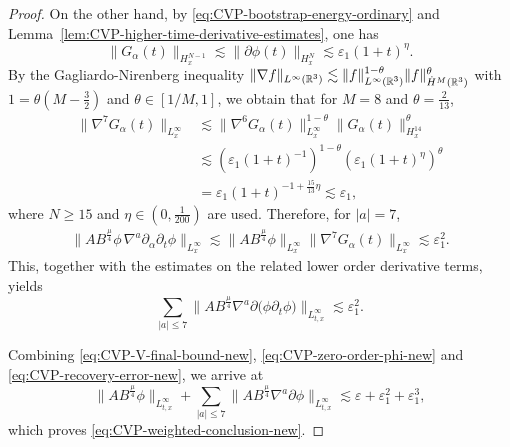 \documentclass[11pt,twoside]{article}
\def\R{\mathop{\mathbb R\kern 0pt}\nolimits}
\def\f{\frac}
\def\p{\partial}
\def\ve{\varepsilon}
\def\ls{\lesssim}
\theoremstyle{plain}
\theoremstyle{definition}
\theoremstyle{assumption}
\numberwithin{equation}{section}
\begin{document}
\begin{proof}
		On the other hand, by \eqref{eq:CVP-bootstrap-energy-ordinary} and 	Lemma~\ref{lem:CVP-higher-time-derivative-estimates},
one has
		\begin{equation}
			\label{eq:CVP-interpolation-high}
			\|G_\alpha(t)\|_{H^{N-1}_x}
			\ls
			\|\p\phi(t)\|_{H^N_x}
			\ls
			\ve_1(1+t)^\eta.
		\end{equation}
		By the Gagliardo-Nirenberg inequality $\|\nabla f \|_{L^\infty(\R^3)} \ls \|f\|_{L^\infty(\R^3)}^{1-\theta}\|f\|_{\dot{H}^M(\R^3)}^\theta $
with  $1=\theta(M-\f32)$ and $\theta \in [1/M,1]$,
		we obtain that for $M=8$ and $\theta=\f{2}{13}$,
		\begin{equation}
			\label{eq:CVP-top-interpolation}
			\begin{aligned}
				\|\nabla^7G_\alpha(t)\|_{L^\infty_x}
				&\ls
				\|\nabla^{6}G_\alpha(t)\|_{L^\infty_x}^{1-\theta}
				\|G_\alpha(t)\|_{H^{14}_x}^{\theta}
				\\
				&\ls
				\left(
				\ve_1(1+t)^{-1}
				\right)^{1-\theta}
				\left(
				\ve_1(1+t)^\eta
				\right)^\theta
				\\
				&=
				\ve_1
				(1+t)^{-1+\f{15}{13}\eta}
				\ls
				\ve_1,
			\end{aligned}
		\end{equation}
		where $N\ge 15$ and $\eta\in(0,\f{1}{200})$ are used.
		Therefore, for \(|a|=7\),
		\begin{equation}
			\label{eq:CVP-top-recovery-product}
			\begin{aligned}
				\big\|
				AB^{\frac{\mu}{4}}
				\phi\,\nabla^a\p_\alpha\p_t\phi
				\big\|_{L^\infty_x}
				\ls
				\big\|
				AB^{\frac{\mu}{4}}\phi
				\big\|_{L^\infty_x}
				\|\nabla^7G_\alpha(t)\|_{L^\infty_x}
				\ls
				\ve_1^2.
			\end{aligned}
		\end{equation}
		This, together with the estimates on the related lower order derivative terms, yields
		\begin{equation}
			\label{eq:CVP-recovery-error-new}
			\sum_{|a|\le 7}
			\big\|
			AB^{\frac{\mu}{4}}
			\nabla^a\p
			\big(
			\phi\p_t\phi
			\big)
			\big\|_{L^\infty_{t,x}}
			\ls
			\ve_1^2.
		\end{equation}
		
		Combining
		\eqref{eq:CVP-V-final-bound-new},
		\eqref{eq:CVP-zero-order-phi-new} and
		\eqref{eq:CVP-recovery-error-new}, we arrive at
		\[
		\big\|
		AB^{\frac{\mu}{4}}\phi
		\big\|_{L^\infty_{t,x}}
		+
		\sum_{|a|\le 7}
		\big\|
		AB^{\frac{\mu}{4}}
		\nabla^a\p\phi
		\big\|_{L^\infty_{t,x}}
		\ls
		\ve+\ve_1^2+\ve_1^3,
		\]
		which proves \eqref{eq:CVP-weighted-conclusion-new}.
	\end{proof}
	
\end{document}
